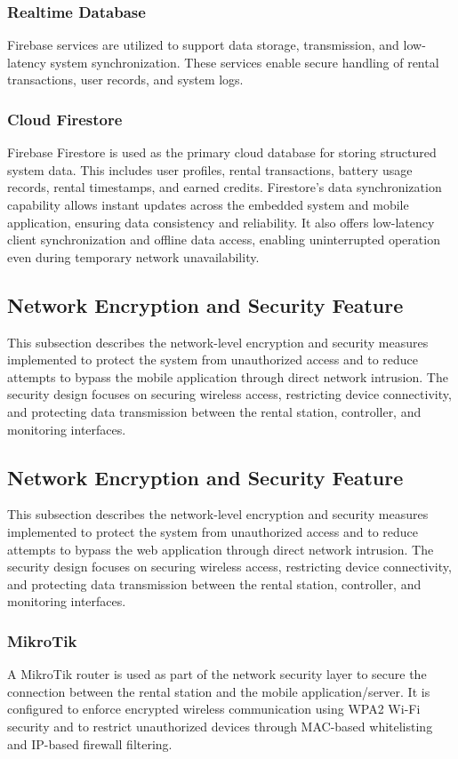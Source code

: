 {\subsubsection{Realtime Database}
Firebase services are utilized to support data storage, transmission, and low-latency system synchronization. These services enable secure handling of rental transactions, user records, and system logs.

\subsubsection{Cloud Firestore}
Firebase Firestore is used as the primary cloud database for storing structured system data. This includes user profiles, rental transactions, battery usage records, rental timestamps, and earned credits. Firestore’s data synchronization capability allows instant updates across the embedded system and mobile application, ensuring data consistency and reliability. It also offers low-latency client synchronization and offline data access, enabling uninterrupted operation even during temporary network unavailability.

\subsection{Network Encryption and Security Feature}
This subsection describes the network-level encryption and security measures implemented to protect the system from unauthorized access and to reduce attempts to bypass the mobile application through direct network intrusion. The security design focuses on securing wireless access, restricting device connectivity, and protecting data transmission between the rental station, controller, and monitoring interfaces.

\subsection{Network Encryption and Security Feature}
This subsection describes the network-level encryption and security measures implemented to protect the system from unauthorized access and to reduce attempts to bypass the web application through direct network intrusion. The security design focuses on securing wireless access, restricting device connectivity, and protecting data transmission between the rental station, controller, and monitoring interfaces.

\subsubsection{MikroTik}
A MikroTik router is used as part of the network security layer to secure the connection between the rental station and the mobile application/server. It is configured to enforce encrypted wireless communication using WPA2 Wi-Fi security and to restrict unauthorized devices through MAC-based whitelisting and IP-based firewall filtering.

}

